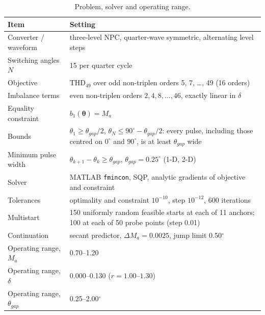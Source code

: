 \begin{table}[!t]
\centering
\caption{Problem, solver and operating range.}
\label{tab:parameters}
\footnotesize
\setlength{\tabcolsep}{4pt}
\begin{tabular}{p{}p{}}
\toprule
Item & Setting \\
\midrule
Converter / waveform & three-level NPC, quarter-wave symmetric, alternating level steps \\
Switching angles $N$ & 15 per quarter cycle \\
Objective & THD$_{49}$ over odd non-triplen orders 5, 7, \ldots, 49 (16 orders) \\
Imbalance terms & even non-triplen orders $2,4,8,\ldots,46$, exactly linear in $\delta$ \\
Equality constraint & $b_1(\boldsymbol\theta) = M_a$ \\
Bounds & $\theta_1 \ge \theta_{gap}/2$, $\theta_N \le 90^\circ - \theta_{gap}/2$: every pulse, including those centred on $0^\circ$ and $90^\circ$, is at least $\theta_{gap}$ wide \\
Minimum pulse width & $\theta_{k+1}-\theta_k \ge \theta_{gap}$, $\theta_{gap} = 0.25^\circ$ (1-D, 2-D) \\
Solver & MATLAB \texttt{fmincon}, SQP, analytic gradients of objective and constraint \\
Tolerances & optimality and constraint $10^{-10}$, step $10^{-12}$, 600 iterations \\
Multistart & 150 uniformly random feasible starts at each of 11 anchors; 100 at each of 50 probe points (step 0.01) \\
Continuation & secant predictor, $\Delta M_a = 0.0025$, jump limit 0.50$^\circ$ \\
Operating range, $M_a$ & 0.70--1.20 \\
Operating range, $\delta$ & 0.000--0.130 ($r = 1.00$--$1.30$) \\
Operating range, $\theta_{gap}$ & 0.25--2.00$^\circ$ \\
\bottomrule
\end{tabular}
\end{table}
